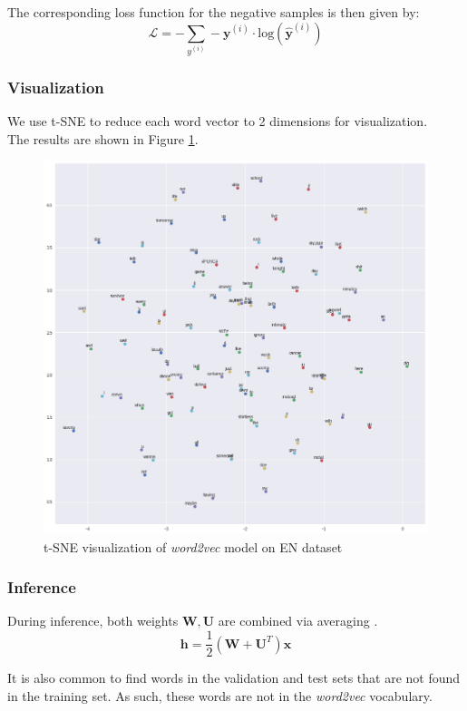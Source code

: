 \documentclass{article}
\numberwithin{equation}{section}
\begin{document}
The corresponding loss function for the negative samples is then given by:
	$$ \mathcal{L} = -\sum_{y^{(i)}} -\bm{y}^{(i)} \cdot \text{log}(\hat{\bm{y}}^{(i)}) $$

\subsubsection{Visualization}
We use t-SNE to reduce each word vector to 2 dimensions for visualization.\\
The results are shown in Figure \ref{fig:word2vec}.

\begin{figure}[h]
	\centering
	\includegraphics[width=0.9\linewidth]{assets/word2vec.png}
	\caption{t-SNE visualization of \emph{word2vec} model on EN dataset}
	\label{fig:word2vec}
\end{figure}

\subsubsection{Inference}
During inference, both weights $\bm{W}, \bm{U}$ are combined via averaging \cite{pennington2014glove}.
	$$ \bm{h} = \frac{1}{2}(\bm{W} + \bm{U}^T) \bm{x} $$

It is also common to find words in the validation and test sets that are not found in the training set. As such, these words are not in the \emph{word2vec} vocabulary. \\
\end{document}
